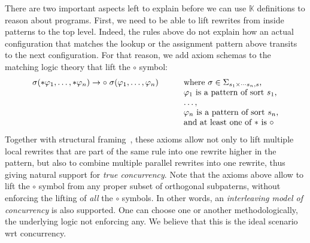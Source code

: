 \documentclass[UTF8,11pt]{article}
\theoremstyle{plain}
\theoremstyle{definition}
\theoremstyle{remark}
\newcommand{\K}{\mbox{$\mathbb{K}$}\xspace}
\begin{document}
There are two important aspects left to explain before we can use \K definitions to
reason about programs.
First, we need to be able to lift rewrites from inside patterns to the
top level.
Indeed, the rules above do not explain how an actual configuration
that matches the lookup or the assignment pattern above transits to
the next configuration.
For that reason, we add axiom schemas to the matching logic theory
that lift the $\circ$ symbol:
$$
\begin{array}{l@{\hspace*{7ex}}l}
\sigma(*\varphi_1,\dots,*\varphi_n) \rightarrow \circ\;\sigma(\varphi_1,\dots,\varphi_n)
& \textrm{where $\sigma\in\Sigma_{s_1\times\cdots s_n,s}$,}
\\ & \textrm{$\varphi_1$ is a pattern of sort $s_1$,}
\\
& \dots,
\\ & \textrm{$\varphi_n$ is a pattern of sort $s_n$,}
\\ & \textrm{and at least one of $*$ is $\circ$}
\end{array}
$$
Together with structural framing~\cite{rosu-2017-lmcs},
these axioms allow not only to lift multiple local rewrites
that are part of the same rule into one rewrite higher in the
pattern, but also to combine multiple parallel rewrites into
one rewrite, thus giving natural support for \emph{true concurrency}.
Note that the axioms above allow to lift the $\circ$ symbol from
any proper subset of orthogonal subpaterns, without enforcing
the lifting of \emph{all} the $\circ$ symbols.
In other words, an \emph{interleaving model of concurrency}
is also supported.
One can choose one or another methodologically, the underlying
logic not enforcing any.
We believe that this is the ideal scenario wrt concurrency.
\end{document}
